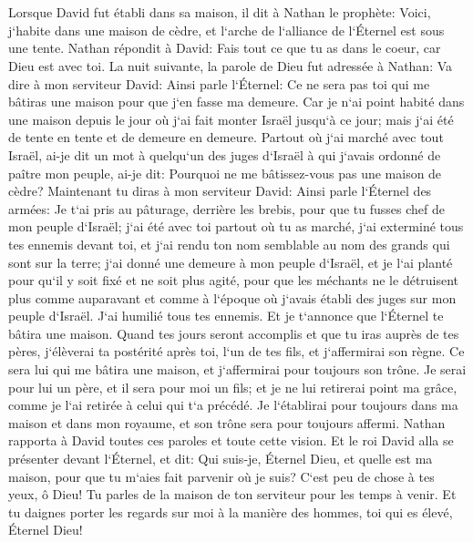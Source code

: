 \chapter{}

\verse Lorsque David fut établi dans sa maison, il dit à Nathan le prophète: Voici, j`habite dans une maison de cèdre, et l`arche de l`alliance de l`Éternel est sous une tente. 
\verse Nathan répondit à David: Fais tout ce que tu as dans le coeur, car Dieu est avec toi. 
\verse La nuit suivante, la parole de Dieu fut adressée à Nathan: 
\verse Va dire à mon serviteur David: Ainsi parle l`Éternel: Ce ne sera pas toi qui me bâtiras une maison pour que j`en fasse ma demeure. 
\verse Car je n`ai point habité dans une maison depuis le jour où j`ai fait monter Israël jusqu`à ce jour; mais j`ai été de tente en tente et de demeure en demeure. 
\verse Partout où j`ai marché avec tout Israël, ai-je dit un mot à quelqu`un des juges d`Israël à qui j`avais ordonné de paître mon peuple, ai-je dit: Pourquoi ne me bâtissez-vous pas une maison de cèdre? 
\verse Maintenant tu diras à mon serviteur David: Ainsi parle l`Éternel des armées: Je t`ai pris au pâturage, derrière les brebis, pour que tu fusses chef de mon peuple d`Israël; 
\verse j`ai été avec toi partout où tu as marché, j`ai exterminé tous tes ennemis devant toi, et j`ai rendu ton nom semblable au nom des grands qui sont sur la terre; 
\verse j`ai donné une demeure à mon peuple d`Israël, et je l`ai planté pour qu`il y soit fixé et ne soit plus agité, pour que les méchants ne le détruisent plus comme auparavant 
\verse et comme à l`époque où j`avais établi des juges sur mon peuple d`Israël. J`ai humilié tous tes ennemis. Et je t`annonce que l`Éternel te bâtira une maison. 
\verse Quand tes jours seront accomplis et que tu iras auprès de tes pères, j`élèverai ta postérité après toi, l`un de tes fils, et j`affermirai son règne. 
\verse Ce sera lui qui me bâtira une maison, et j`affermirai pour toujours son trône. 
\verse Je serai pour lui un père, et il sera pour moi un fils; et je ne lui retirerai point ma grâce, comme je l`ai retirée à celui qui t`a précédé. 
\verse Je l`établirai pour toujours dans ma maison et dans mon royaume, et son trône sera pour toujours affermi. 
\verse Nathan rapporta à David toutes ces paroles et toute cette vision. 
\verse Et le roi David alla se présenter devant l`Éternel, et dit: Qui suis-je, Éternel Dieu, et quelle est ma maison, pour que tu m`aies fait parvenir où je suis? 
\verse C`est peu de chose à tes yeux, ô Dieu! Tu parles de la maison de ton serviteur pour les temps à venir. Et tu daignes porter les regards sur moi à la manière des hommes, toi qui es élevé, Éternel Dieu! 
